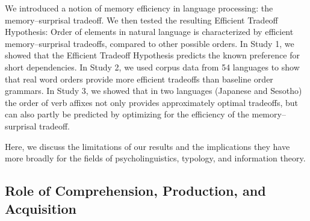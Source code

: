 \label{sec:discussion}

We introduced a notion of memory efficiency in language processing: the memory--surprisal tradeoff.
We then tested the resulting Efficient Tradeoff Hypothesis: Order of elements in natural language is characterized by efficient memory--surprisal tradeoffs, compared to other possible orders.
In Study 1, we showed that the Efficient Tradeoff Hypothesis predicts the known preference for short dependencies.
In Study 2, we used corpus data from 54 languages to show that real word orders provide more efficient tradeoffs than baseline order grammars.
In Study 3, we showed that in two languages (Japanese and Sesotho) the order of verb affixes not only provides approximately optimal tradeoffs, but can also partly be predicted by optimizing for the efficiency of the memory--surprisal tradeoff.

Here, we discuss the limitations  of our results and the implications they have more broadly for the fields of psycholinguistics, typology, and information theory.






\subsection{Role of Comprehension, Production, and Acquisition}





